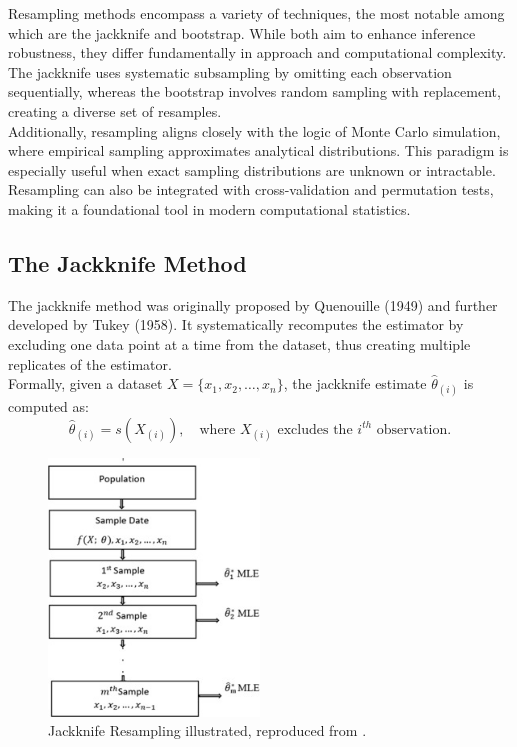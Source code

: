 \documentclass{article}
\begin{document}
Resampling methods encompass a variety of techniques, the most notable among which are the jackknife and bootstrap. While both aim to enhance inference robustness, they differ fundamentally in approach and computational complexity. The jackknife uses systematic subsampling by omitting each observation sequentially, whereas the bootstrap involves random sampling with replacement, creating a diverse set of resamples. \\

Additionally, resampling aligns closely with the logic of Monte Carlo simulation, where empirical sampling approximates analytical distributions. This paradigm is especially useful when exact sampling distributions are unknown or intractable. Resampling can also be integrated with cross-validation and permutation tests, making it a foundational tool in modern computational statistics. \\

\subsection{The Jackknife Method}

The jackknife method was originally proposed by Quenouille (1949) and further developed by Tukey (1958). It systematically recomputes the estimator by excluding one data point at a time from the dataset, thus creating multiple replicates of the estimator. \\

Formally, given a dataset \( X = \{x_1, x_2, \dots, x_n\} \), the jackknife estimate \( \hat{\theta}_{(i)} \) is computed as:
\[
\hat{\theta}_{(i)} = s(X_{(i)}), \quad \text{where } X_{(i)} \text{ excludes the } i^{th} \text{ observation}.
\]

\begin{figure}[h!]
\centering
\includegraphics[width=0.5\textwidth]{Jackknife.jpg} 
\caption{Jackknife Resampling illustrated, reproduced from \cite{sciencedirect-jackknife}.}
\label{fig:jackknife-sd}
\end{figure}
\end{document}
